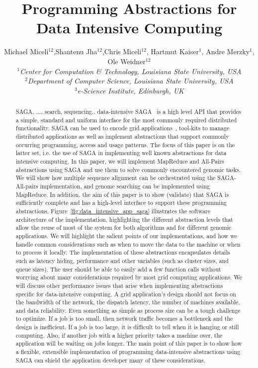 \documentclass{rspublic}
\title{Programming Abstractions for Data Intensive Computing}
\author{Michael Miceli$^{12}$,Shantenu Jha$^{12}$,Chris Miceli$^{12}$, 
  Hartmut Kaiser$^{1}$, Andre Merzky$^{1}$, Ole Weidner$^{12}$ \\
  \small{\emph{$^{1}$Center for Computation \& Technology, Louisiana
      State University, USA}}\\
  \small{\emph{$^{2}$Department of Computer Science, Louisiana State
      University, USA}}\\
  \small{\emph{$^{3}$e-Science Institute, Edinburgh, UK}}\\
}
\begin{document}
\maketitle

\begin{abstract}{SAGA, ..., search, sequencing.. data-intensive}
  SAGA~\cite{saga_gfd90} is a high level API that provides a simple,
  standard and uniform interface for the most commonly required
  distributed functionality.  SAGA can be used to encode grid
  applications~\cite{saga_escience07, saga_tg08}, tool-kits to manage
  distributed applications as well as implement abstractions that
  support commonly occurring programming, access and usage patterns.
  The focus of this paper is on the latter set, i.e.  the use of SAGA
  in implementing well known abstractions for data intensive
  computing.  In this paper, we will implement MapReduce and All-Pairs
  abstractions using SAGA and use them to solve commonly encountered
  genomic tasks.  We will show how multiple sequence alignment can be
  orchestrated using the SAGA-All-pairs implementation, and genome
  searching can be implemented using MapReduce.  In addition, the aim
  of this paper is to show (validate) that SAGA is sufficiently
  complete and has a high-level interface to support these programming
  abstractions.  Figure~\ref{fig:data_intensive_app_saga} illustrates
  the software architecture of the implementation, highlighting the
  different abstraction levels that allow the reuse of most of the
  system for both algorithms and for different genomic applications.
  We will highlight the salient points of our implementations, and how
  we handle common considerations such as when to move the data to the
  machine or when to process it locally.  The implementation of these
  abstractions encapsulates details such as latency hiding,
  performance and other variables (such as cluster sizes, and queue
  sizes).  The user should be able to easily add a few function calls
  without worrying about many considerations required by most grid
  computing applications.  We will discuss other performance issues
  that arise when implementing abstractions specific for
  data-intensive computing.  A grid application's design should not
  focus on the bandwidth of the network, the dispatch latency, the
  number of machines available, and data reliability.  Even something
  as simple as process size can be a tough challenge to optimize.  If
  a job is too small, then network traffic becomes a bottleneck and
  the design is inefficient.  If a job is too large, it is difficult
  to tell when it is hanging or still computing.  Also, if another job
  with a higher priority takes a machine over, the application will be
  waiting on jobs longer.  The main point of this paper is to show how
  a flexible, extensible implementation of programming data-intensive
  abstractions using SAGA can shield the application developer many of
  these considerations.

\end{abstract}
\end{document}
